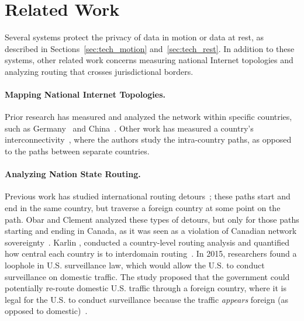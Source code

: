 \section{Related Work}
\label{sec:related}

Several systems protect the privacy of data in motion or data at rest, as
described in Sections~\ref{sec:tech_motion} and~\ref{sec:tech_rest}.  In
addition to these systems, other related work concerns measuring national
Internet topologies and analyzing routing that crosses jurisdictional borders.

\paragraph{Mapping National Internet Topologies.}  Prior research has measured
and analyzed the network within specific countries, such as Germany~\cite{wahlisch2010framework,wahlisch2012exposing} and China~\cite{zhou2007chinese}.  Other work has measured a country's interconnectivity~\cite{bischof2015and,fanou2015diversity,gupta2014peering}, where the authors study the intra-country paths, as opposed to the paths between separate countries.


\paragraph{Analyzing Nation State Routing.}  Previous work has studied international
routing detours~\cite{shah2015characterizing}; these paths start and end in the same country, but traverse a foreign country at some point on the path.  Obar and Clement analyzed these types of detours, but only for those paths starting and ending in Canada, as it was seen as a violation of Canadian network sovereignty~\cite{obar2013internet}.  Karlin \ea, conducted a country-level routing analysis and quantified how central each country is to interdomain routing~\cite{karlin2009nation}.  In 2015, researchers found a loophole in U.S. surveillance law, which would allow the U.S. to conduct surveillance on domestic traffic.  The study proposed that the government could potentially re-route domestic U.S. traffic through a foreign country, where it is legal for the U.S. to conduct surveillance because the traffic {\it appears} foreign (as opposed to domestic)~\cite{arnbak2015loopholes}.
